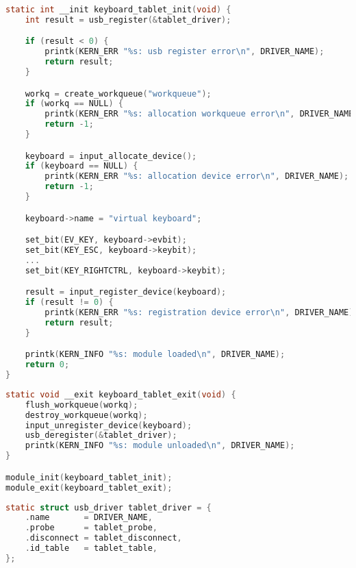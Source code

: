 \begin{lstlisting}[language=c,caption=Инициализация модуля,label=lst:init]
static int __init keyboard_tablet_init(void) {
    int result = usb_register(&tablet_driver);

    if (result < 0) {
        printk(KERN_ERR "%s: usb register error\n", DRIVER_NAME);
        return result;
    }

    workq = create_workqueue("workqueue");
    if (workq == NULL) {
        printk(KERN_ERR "%s: allocation workqueue error\n", DRIVER_NAME);
        return -1;
    }

    keyboard = input_allocate_device();
    if (keyboard == NULL) {
        printk(KERN_ERR "%s: allocation device error\n", DRIVER_NAME);
        return -1;
    }

    keyboard->name = "virtual keyboard";

    set_bit(EV_KEY, keyboard->evbit);
    set_bit(KEY_ESC, keyboard->keybit);
    ...
    set_bit(KEY_RIGHTCTRL, keyboard->keybit);

    result = input_register_device(keyboard);
    if (result != 0) {
        printk(KERN_ERR "%s: registration device error\n", DRIVER_NAME);
        return result;
    }

    printk(KERN_INFO "%s: module loaded\n", DRIVER_NAME);
    return 0;
}
\end{lstlisting}

\begin{lstlisting}[language=c,caption=Выгруза модуля и установка функций init и exit,label=lst:exit]
static void __exit keyboard_tablet_exit(void) {
    flush_workqueue(workq);
    destroy_workqueue(workq);
    input_unregister_device(keyboard);
    usb_deregister(&tablet_driver);
    printk(KERN_INFO "%s: module unloaded\n", DRIVER_NAME);
}

module_init(keyboard_tablet_init);
module_exit(keyboard_tablet_exit);
\end{lstlisting}

\begin{lstlisting}[language=c,caption=Объявление экземпляра usb драйвера]
static struct usb_driver tablet_driver = {
    .name       = DRIVER_NAME,
    .probe      = tablet_probe,
    .disconnect = tablet_disconnect,
    .id_table   = tablet_table,
};
\end{lstlisting}


